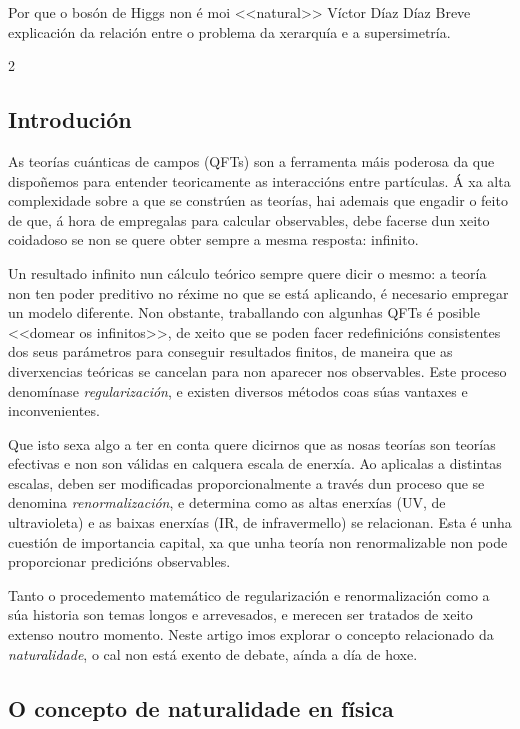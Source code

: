 \Artigo*%
{divulgacion}%
{Por que o bosón de Higgs non é moi <<natural>>}%
{Víctor Díaz Díaz}%
{Breve explicación da relación entre o problema da xerarquía e a
supersimetría.}%

\begin{multicols}{2}

\subsection*{Introdución}

As teorías cuánticas de campos (QFTs) son a ferramenta máis poderosa da que
dispoñemos para entender teoricamente as interaccións entre partículas. Á xa
alta complexidade sobre a que se constrúen as teorías, hai ademais que engadir
o feito de que, á hora de empregalas para calcular observables, debe facerse
dun xeito coidadoso se non se quere obter sempre a mesma resposta: infinito.

Un resultado infinito nun cálculo teórico sempre quere dicir o mesmo: a teoría
non ten poder preditivo no réxime no que se está aplicando, é necesario
empregar un modelo diferente. Non obstante, traballando con algunhas QFTs é
posible <<domear os infinitos>>, de xeito que se poden facer redefinicións
consistentes dos seus parámetros para conseguir resultados finitos, de maneira
que as diverxencias teóricas se cancelan para non aparecer nos observables.
Este proceso denomínase \textit{regularización}, e existen diversos métodos
coas súas vantaxes e inconvenientes.

Que isto sexa algo a ter en conta quere dicirnos que as nosas teorías son
teorías efectivas e non son válidas en calquera escala de enerxía. Ao
aplicalas a distintas escalas, deben ser modificadas proporcionalmente a través
dun proceso que se denomina \textit{renormalización}, e determina como as altas
enerxías (UV, de ultravioleta) e as baixas enerxías (IR, de infravermello) se
relacionan. Esta é unha cuestión de importancia capital, xa que unha teoría non
renormalizable non pode proporcionar predicións observables.

Tanto o procedemento matemático de regularización e renormalización como a súa
historia son temas longos e arrevesados, e merecen ser tratados de xeito
extenso noutro momento. Neste artigo imos explorar o concepto relacionado da
\textit{naturalidade}, o cal non está exento de debate, aínda a día de hoxe.

\subsection*{O concepto de naturalidade en física}


\end{multicols}
